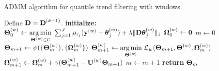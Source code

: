 \documentclass[12pt]{article}
\newcommand{\V}[1]{{\bm{\mathbf{\MakeLowercase{#1}}}}} %
\newcommand{\Vn}[2]{\V{#1}^{(#2)}} %
\newcommand{\M}[1]{{\bm{\mathbf{\MakeUppercase{#1}}}}} %
\newcommand{\Mn}[2]{\M{#1}^{(#2)}} %
\begin{document}
	\begin{algorithm}
		\caption{ADMM algorithm for quantile trend filtering with windows}\label{alg:admm}
		\begin{algorithmic}		
			\State Define $\M{D} = \Mn{D}{k+1}$. 
			\State \textbf{initialize:}
			\State $\Mn{\Theta}{w}_0 \gets \underset{\Mn{\Theta}{w} \in \mathcal{C}}{\arg \min}\; 			
			 \sum_{j=1}^J\rho_{\tau_j}(\Vn{y}{w} - \Vn{\theta}{w}_{j})+\lambda \lVert \M{D}\Vn{\theta}{w}_{j}\rVert_1$
			\State $\Mn{\Omega}{w}_0 \gets \M{0}$
			\EndFor
			\State $m \gets 0$
			\Repeat{}
			\State $\M{\Theta}_{m+1} \gets \psi(\{\Mn{\Theta}{w}_m\}, \{\Mn{\Omega}{w}_m\})$
			\State $\Mn{\Theta}{w}_{m+1} \gets \underset{\Mn{\Theta}{w}}{\arg\min}\; \mathcal{L}_w(\M{\Theta}_{m+1}, \Mn{\Theta}{w}, \Mn{\Omega}{w}_{m})$
			\State 
			$\Mn{\Omega}{w}_{m+1} \gets \Mn{\Omega}{w}_m + \gamma(\Mn{\Theta}{w}_{m+1} - \Mn{U}{w}\M{\Theta}_{m+1})$			
			\EndFor
			\State $m \gets m + 1$
			\State \textbf{return} $\M{\Theta}_m$
		\end{algorithmic}
	\end{algorithm}
\end{document}
